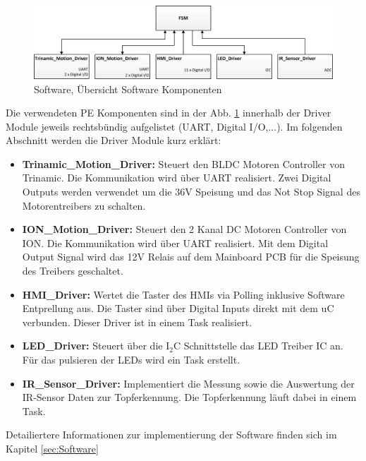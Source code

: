 \begin{figure}[H]
	\includegraphics[width=1\textwidth]{Illustrationen/5-Konzept/Software_Uebersicht.png}
	\caption{Software, Übersicht Software Komponenten}
	\label{fig:Software_Uebersicht}
\end{figure}

Die verwendeten PE Komponenten sind in der Abb. \ref{fig:Software_Uebersicht} innerhalb der Driver Module jeweils rechtsbündig aufgelistet (UART, Digital I/O,...). Im folgenden Abschnitt werden die Driver Module kurz erklärt:

\begin{itemize}
	\item \textbf{Trinamic\_Motion\_Driver:} Steuert den BLDC Motoren Controller von Trinamic. Die Kommunikation wird über UART realisiert. Zwei Digital Outputs werden verwendet um die 36V Speisung und das Not Stop Signal des Motorentreibers zu schalten.
	\item \textbf{ION\_Motion\_Driver:} Steuert den 2 Kanal DC Motoren Controller von ION. Die Kommunikation wird über UART realisiert. Mit dem Digital Output Signal wird das 12V Relais auf dem Mainboard PCB für die Speisung des Treibers geschaltet.
	\item \textbf{HMI\_Driver:} Wertet die Taster des HMIs via Polling inklusive Software Entprellung aus. Die Taster sind über Digital Inputs direkt mit dem uC verbunden. Dieser Driver ist in einem Task realisiert.
	\item \textbf{LED\_Driver:} Steuert über die I$_{2}$C Schnittstelle das LED Treiber IC an. Für das pulsieren der LEDs wird ein Task erstellt.
	\item \textbf{IR\_Sensor\_Driver:} Implementiert die Messung sowie die Auswertung der IR-Sensor Daten zur Topferkennung. Die Topferkennung läuft dabei in einem Task.
\end{itemize}

Detailiertere Informationen zur implementierung der Software finden sich im Kapitel \ref{sec:Software}